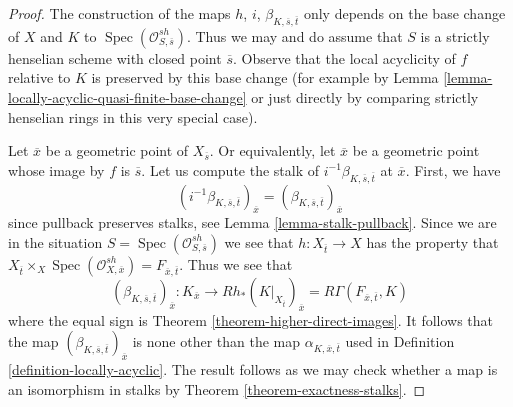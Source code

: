 \documentclass[10pt,a4paper]{amsart}
\theoremstyle{plain}
\theoremstyle{definition}
\theoremstyle{remark}
\numberwithin{equation}{subsection}
\def\Spec{\mathop{\mathrm{Spec}}}
\begin{document}
\begin{proof}
The construction of the maps $h$, $i$, $\beta_{K, \overline{s}, \overline{t}}$
only depends on the
base change of $X$ and $K$ to $\Spec(\mathcal{O}^{sh}_{S, \overline{s}})$.
Thus we may and do assume that $S$ is a strictly henselian scheme
with closed point $\overline{s}$. Observe that the local acyclicity
of $f$ relative to $K$ is preserved by this base change (for example
by Lemma \ref{lemma-locally-acyclic-quasi-finite-base-change} or just
directly by comparing strictly henselian rings in this very special case).

\medskip\noindent
Let $\overline{x}$ be a geometric point of $X_{\overline{s}}$.
Or equivalently, let $\overline{x}$ be a geometric point whose image
by $f$ is $\overline{s}$. Let us compute the stalk of
$i^{-1}\beta_{K, \overline{s}, \overline{t}}$
at $\overline{x}$. First, we have
$$
(i^{-1}\beta_{K, \overline{s}, \overline{t}})_{\overline{x}} =
(\beta_{K, \overline{s}, \overline{t}})_{\overline{x}}
$$
since pullback preserves stalks, see Lemma \ref{lemma-stalk-pullback}.
Since we are in the situation $S = \Spec(\mathcal{O}^{sh}_{S, \overline{s}})$
we see that $h : X_{\overline{t}} \to X$ has the property that
$X_{\overline{t}} \times_X \Spec(\mathcal{O}^{sh}_{X, \overline{x}})
= F_{\overline{x}, \overline{t}}$. Thus we see that
$$
(\beta_{K, \overline{s}, \overline{t}})_{\overline{x}} :
K_{\overline{x}}
\longrightarrow
Rh_*(K|_{X_{\overline{t}}})_{\overline{x}} =
R\Gamma(F_{\overline{x}, \overline{t}}, K)
$$
where the equal sign is Theorem \ref{theorem-higher-direct-images}.
It follows that the map $(\beta_{K, \overline{s}, \overline{t}})_{\overline{x}}$
is none other than the map $\alpha_{K, \overline{x}, \overline{t}}$ used
in Definition \ref{definition-locally-acyclic}. The result follows as we may
check whether a map is an isomorphism in stalks by
Theorem \ref{theorem-exactness-stalks}.
\end{proof}
\end{document}
